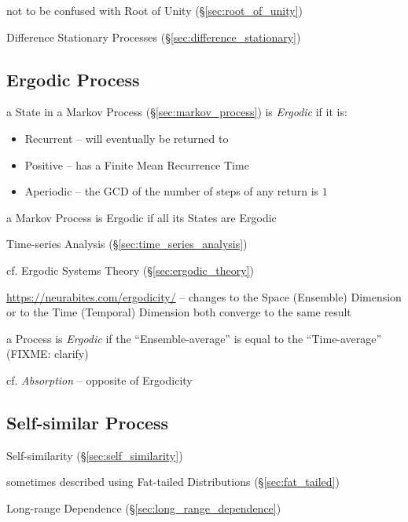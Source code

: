 \fist not to be confused with Root of Unity (\S\ref{sec:root_of_unity})

Difference Stationary Processes (\S\ref{sec:difference_stationary})



\subsection{Ergodic Process}\label{sec:ergodic_process}

a State in a Markov Process (\S\ref{sec:markov_process}) is \emph{Ergodic} if it
is:
\begin{itemize}
  \item Recurrent -- will eventually be returned to
  \item Positive -- has a Finite Mean Recurrence Time
  \item Aperiodic -- the GCD of the number of steps of any return is $1$
\end{itemize}
a Markov Process is Ergodic if all its States are Ergodic

\fist Time-series Analysis (\S\ref{sec:time_series_analysis})

\fist cf. Ergodic Systems Theory (\S\ref{sec:ergodic_theory})

\url{https://neurabites.com/ergodicity/} -- changes to the Space (Ensemble)
Dimension or to the Time (Temporal) Dimension both converge to the same result

a Process is \emph{Ergodic} if the ``Ensemble-average'' is equal to the
``Time-average'' (FIXME: clarify)

cf. \emph{Absorption} -- opposite of Ergodicity



\subsection{Self-similar Process}\label{sec:self_similar}

Self-similarity (\S\ref{sec:self_similarity})

sometimes described using Fat-tailed Distributions (\S\ref{sec:fat_tailed})

Long-range Dependence (\S\ref{sec:long_range_dependence})




